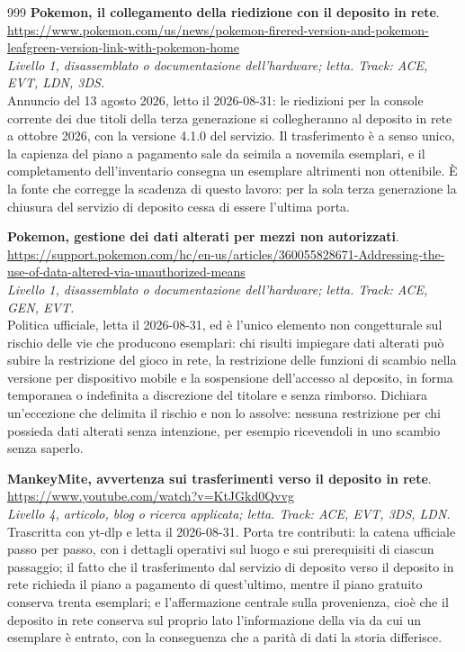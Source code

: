 \begin{thebibliography}{999}
  \textbf{Pokemon, il collegamento della riedizione con il deposito in rete}.
  \\ \url{https://www.pokemon.com/us/news/pokemon-firered-version-and-pokemon-leafgreen-version-link-with-pokemon-home}
  \\ \emph{Livello 1, disassemblato o documentazione dell'hardware; letta. Track: ACE, EVT, LDN, 3DS.}
  \\ Annuncio del 13 agosto 2026, letto il 2026-08-31: le riedizioni per la console corrente dei due titoli della terza generazione si collegheranno al deposito in rete a ottobre 2026, con la versione 4.1.0 del servizio. Il trasferimento è a senso unico, la capienza del piano a pagamento sale da seimila a novemila esemplari, e il completamento dell'inventario consegna un esemplare altrimenti non ottenibile. È la fonte che corregge la scadenza di questo lavoro: per la sola terza generazione la chiusura del servizio di deposito cessa di essere l'ultima porta.

  \textbf{Pokemon, gestione dei dati alterati per mezzi non autorizzati}.
  \\ \url{https://support.pokemon.com/hc/en-us/articles/360055828671-Addressing-the-use-of-data-altered-via-unauthorized-means}
  \\ \emph{Livello 1, disassemblato o documentazione dell'hardware; letta. Track: ACE, GEN, EVT.}
  \\ Politica ufficiale, letta il 2026-08-31, ed è l'unico elemento non congetturale sul rischio delle vie che producono esemplari: chi risulti impiegare dati alterati può subire la restrizione del gioco in rete, la restrizione delle funzioni di scambio nella versione per dispositivo mobile e la sospensione dell'accesso al deposito, in forma temporanea o indefinita a discrezione del titolare e senza rimborso. Dichiara un'eccezione che delimita il rischio e non lo assolve: nessuna restrizione per chi possieda dati alterati senza intenzione, per esempio ricevendoli in uno scambio senza saperlo.

  \textbf{MankeyMite, avvertenza sui trasferimenti verso il deposito in rete}.
  \\ \url{https://www.youtube.com/watch?v=KtJGkd0Qvvg}
  \\ \emph{Livello 4, articolo, blog o ricerca applicata; letta. Track: ACE, EVT, 3DS, LDN.}
  \\ Trascritta con yt-dlp e letta il 2026-08-31. Porta tre contributi: la catena ufficiale passo per passo, con i dettagli operativi sul luogo e sui prerequisiti di ciascun passaggio; il fatto che il trasferimento dal servizio di deposito verso il deposito in rete richieda il piano a pagamento di quest'ultimo, mentre il piano gratuito conserva trenta esemplari; e l'affermazione centrale sulla provenienza, cioè che il deposito in rete conserva sul proprio lato l'informazione della via da cui un esemplare è entrato, con la conseguenza che a parità di dati la storia differisce.


\end{thebibliography}
